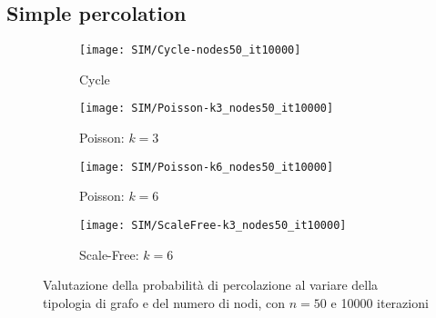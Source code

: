 \subsection{Simple percolation}\label{subsec:app-simple-percolation}
    \begin{figure}[H]
        \begin{minipage}{\linewidth}
            \centering
            \begin{minipage}{0.45\linewidth}
                \begin{figure}[H]
                \texttt{[image: SIM/Cycle-nodes50\_it10000]}\caption{Cycle}
                \label{fig:sim_cycle_nodes_50}
                \end{figure}
            \end{minipage}
            \hspace{0.05\linewidth}
            \begin{minipage}{0.45\linewidth}
                \begin{figure}[H]
                \texttt{[image: SIM/Poisson-k3\_nodes50\_it10000]}\caption{Poisson: $k=3$}
                \label{fig:sim_poisson_k_3_nodes_50}
                \end{figure}
            \end{minipage}
            \begin{minipage}{0.45\linewidth}
                \begin{figure}[H]
                \texttt{[image: SIM/Poisson-k6\_nodes50\_it10000]}\caption{Poisson: $k=6$}
                \label{fig:sim_poisson_k_6_nodes_50}
                \end{figure}
            \end{minipage}
            \begin{minipage}{0.45\linewidth}
                \begin{figure}[H]
                \texttt{[image: SIM/ScaleFree-k3\_nodes50\_it10000]}\caption{Scale-Free: $k=6$}
                \label{fig:sim_scale_free_k_3_nodes_50}
                \end{figure}
            \end{minipage}
            \caption{Valutazione della probabilità di percolazione al variare della tipologia di grafo e del numero di nodi,
            con $n=50$ e 10000 iterazioni}
        \end{minipage}
    \end{figure}

